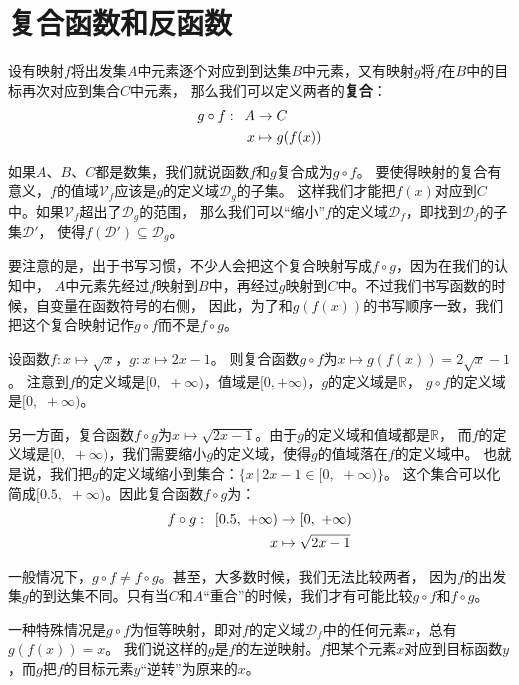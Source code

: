\documentclass[12pt,UTF8]{ctexbook}
\begin{document}
\section{复合函数和反函数}

设有映射$f$将出发集$A$中元素逐个对应到到达集$B$中元素，又有映射$g$将$f$在$B$中的目标再次对应到集合$C$中元素，
那么我们可以定义两者的\textbf{复合}：
\begin{align}
    g\circ f : \,\,\, A &\rightarrow C \notag \\
    x &\mapsto g(f(x)) \notag
\end{align}

如果$A$、$B$、$C$都是数集，我们就说函数$f$和$g$复合成为$g\circ f$。
要使得映射的复合有意义，$f$的值域$\mathcal{V}_f$应该是$g$的定义域$\mathcal{D}_g$的子集。
这样我们才能把$f(x)$对应到$C$中。如果$\mathcal{V}_f$超出了$\mathcal{D}_g$的范围，
那么我们可以“缩小”$f$的定义域$\mathcal{D}_f$，即找到$\mathcal{D}_f$的子集$\mathcal{D}'$，
使得$f(\mathcal{D}')\subseteq \mathcal{D}_g$。

要注意的是，出于书写习惯，不少人会把这个复合映射写成$f\circ g$，因为在我们的认知中，
$A$中元素先经过$f$映射到$B$中，再经过$g$映射到$C$中。不过我们书写函数的时候，自变量在函数符号的右侧，
因此，为了和$g(f(x))$的书写顺序一致，我们把这个复合映射记作$g\circ f$而不是$f\circ g$。

设函数$f:x\mapsto \sqrt{x}$，$g:x\mapsto 2x - 1$。
则复合函数$g\circ f$为$x\mapsto g(f(x)) = 2\sqrt{x} - 1$。
注意到$f$的定义域是$[0, \,\,+\infty)$，值域是$[0, +\infty)$，$g$的定义域是$\mathbb{R}$，
$g\circ f$的定义域是$[0,\,\, +\infty)$。

另一方面，复合函数$f\circ g$为$x\mapsto \sqrt{2x - 1}$。由于$g$的定义域和值域都是$\mathbb{R}$，
而$f$的定义域是$[0,\,\, +\infty)$，我们需要缩小$g$的定义域，使得$g$的值域落在$f$的定义域中。
也就是说，我们把$g$的定义域缩小到集合：$\{x \,|\, 2x - 1 \in [0, \,\,+\infty)\}$。
这个集合可以化简成$[0.5, \,\,+\infty)$。因此复合函数$f\circ g$为：
\begin{align}
    f\circ g : \,\,\, [0.5,\,\, +\infty) &\rightarrow [0,\,\, +\infty) \notag \\
    x &\mapsto \sqrt{2x - 1} \notag
\end{align}

一般情况下，$g\circ f \neq f\circ g$。甚至，大多数时候，我们无法比较两者，
因为$f$的出发集$g$的到达集不同。只有当$C$和$A$“重合”的时候，我们才有可能比较$g\circ f$和$f\circ g$。

一种特殊情况是$g\circ f$为恒等映射，即对$f$的定义域$\mathcal{D}_f$中的任何元素$x$，总有$g(f(x)) = x$。
我们说这样的$g$是$f$的左逆映射。$f$把某个元素$x$对应到目标函数$y$，而$g$把$f$的目标元素$y$“逆转”为原来的$x$。
\end{document}
